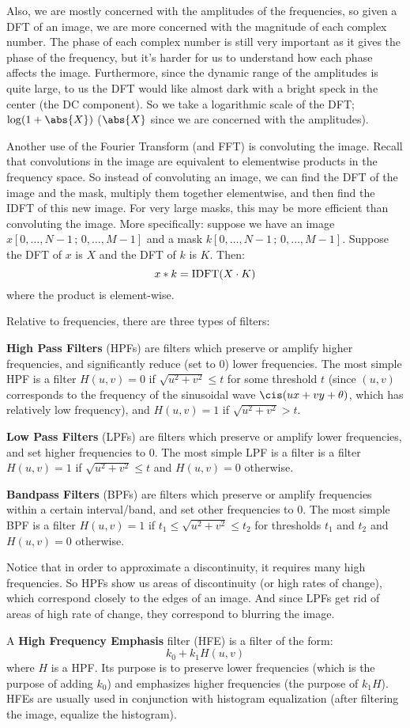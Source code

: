 \documentclass[10pt]{article}
\begin{document}
Also, we are mostly concerned with the amplitudes of the frequencies, so given a DFT of an image, we are more concerned with the magnitude of each complex number.
The phase of each complex number is still very important as it gives the phase of the frequency, but it's harder for us to understand how each phase affects the image.
Furthermore, since the dynamic range of the amplitudes is quite large, to us the DFT would like almost dark with a bright speck in the center (the DC component).
So we take a logarithmic scale of the DFT; $\log(1+\abs{X})$ ($\abs{X}$ since we are concerned with the amplitudes).

Another use of the Fourier Transform (and FFT) is convoluting the image.
Recall that convolutions in the image are equivalent to elementwise products in the frequency space.
So instead of convoluting an image, we can find the DFT of the image and the mask, multiply them together elementwise, and then find the IDFT of this new image.
For very large masks, this may be more efficient than convoluting the image.
More specifically: suppose we have an image $x[0,\dots,N-1\,;\,0,\dots,M-1]$ and a mask $k[0,\dots,N-1\,;\,0,\dots,M-1]$.
Suppose the DFT of $x$ is $X$ and the DFT of $k$ is $K$.
Then:
\[ x\ast k = {\rm IDFT}(X\cdot K) \]
where the product is element-wise.

Relative to frequencies, there are three types of filters:

\benum
    \item \textbf{High Pass Filters} (HPFs) are filters which preserve or amplify higher frequencies, and significantly reduce (set to $0$) lower frequencies.
    The most simple HPF is a filter $H(u,v)=0$ if $\sqrt{u^2+v^2}\leq t$ for some threshold $t$ (since $(u,v)$ corresponds to the frequency of the sinusoidal wave $\cis(ux+vy+\theta)$, which has relatively
    low frequency), and $H(u,v)=1$ if $\sqrt{u^2+v^2}>t$.
    \item \textbf{Low Pass Filters} (LPFs) are filters which preserve or amplify lower frequencies, and set higher frequencies to $0$.
    The most simple LPF is a filter is a filter $H(u,v)=1$ if $\sqrt{u^2+v^2}\leq t$ and $H(u,v)=0$ otherwise.
    \item \textbf{Bandpass Filters} (BPFs) are filters which preserve or amplify frequencies within a certain interval/band, and set other frequencies to $0$.
    The most simple BPF is a filter $H(u,v)=1$ if $t_1\leq\sqrt{u^2+v^2}\leq t_2$ for thresholds $t_1$ and $t_2$ and $H(u,v)=0$ otherwise.
\eenum

Notice that in order to approximate a discontinuity, it requires many high frequencies.
So HPFs show us areas of discontinuity (or high rates of change), which correspond closely to the edges of an image.
And since LPFs get rid of areas of high rate of change, they correspond to blurring the image.

A \textbf{High Frequency Emphasis} filter (HFE) is a filter of the form:
\[ k_0 + k_1H(u,v) \]
where $H$ is a HPF.
Its purpose is to preserve lower frequencies (which is the purpose of adding $k_0$) and emphasizes higher frequencies (the purpose of $k_1H$).
HFEs are usually used in conjunction with histogram equalization (after filtering the image, equalize the histogram).
\end{document}
